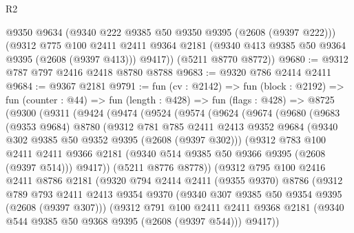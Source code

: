 \begin{lexlean}{R2}
\begin{coremodule}
        @9350
        @9634
        (@9340 @222 @9385 @50 @9350 @9395 (@2608 (@9397 @222)))
        (@9312
          @775
          @100
          @2411
          @2411
          @9364
          @2181
          (@9340 @413 @9385 @50 @9364 @9395 (@2608 (@9397 @413)))
          @9417))
      (@5211 @8770 @8772))
@9680 := @9312 @787 @797 @2416 @2418 @8780 @8788
@9683 := @9320 @786 @2414 @2411
@9684 := @9367 @2181
@9791 := fun (cv : @2142) =>
  fun (block : @2192) =>
  fun (counter : @44) =>
  fun (length : @428) =>
  fun (flags : @428) =>
  @8725
    (@9300
      (@9311
        (@9424
          (@9474
            (@9524
              (@9574
                (@9624
                  (@9674
                    (@9680
                      (@9683
                        (@9353 @9684)
                        @8780
                        (@9312
                          @781
                          @785
                          @2411
                          @2413
                          @9352
                          @9684
                          (@9340 @302 @9385 @50 @9352 @9395 (@2608 (@9397 @302)))
                          (@9312
                            @783
                            @100
                            @2411
                            @2411
                            @9366
                            @2181
                            (@9340 @514 @9385 @50 @9366 @9395 (@2608 (@9397 @514)))
                            @9417))
                        (@5211 @8776 @8778))
                      (@9312
                        @795
                        @100
                        @2416
                        @2411
                        @8786
                        @2181
                        (@9320
                          @794
                          @2414
                          @2411
                          (@9355 @9370)
                          @8786
                          (@9312
                            @789
                            @793
                            @2411
                            @2413
                            @9354
                            @9370
                            (@9340 @307 @9385 @50 @9354 @9395 (@2608 (@9397 @307)))
                            (@9312
                              @791
                              @100
                              @2411
                              @2411
                              @9368
                              @2181
                              (@9340 @544 @9385 @50 @9368 @9395 (@2608 (@9397 @544)))
                              @9417))

\end{coremodule}
\end{lexlean}
